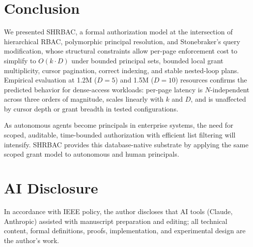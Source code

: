 \documentclass[conference]{IEEEtran}
\begin{document}
\section{Conclusion}
\label{sec:conclusion}

We presented SHRBAC, a formal authorization model at the intersection of hierarchical RBAC, polymorphic principal resolution, and Stonebraker's query modification, whose structural constraints allow per-page enforcement cost to simplify to $O(k \cdot D)$ under bounded principal sets, bounded local grant multiplicity, cursor pagination, correct indexing, and stable nested-loop plans. Empirical evaluation at 1.2M ($D{=}5$) and 1.5M ($D{=}10$) resources confirms the predicted behavior for dense-access workloads: per-page latency is $N$-independent across three orders of magnitude, scales linearly with $k$ and $D$, and is unaffected by cursor depth or grant breadth in tested configurations.

As autonomous agents become principals in enterprise systems, the need for scoped, auditable, time-bounded authorization with efficient list filtering will intensify. SHRBAC provides this database-native substrate by applying the same scoped grant model to autonomous and human principals.

\section*{AI Disclosure}
In accordance with IEEE policy, the author discloses that AI tools (Claude, Anthropic) assisted with manuscript preparation and editing; all technical content, formal definitions, proofs, implementation, and experimental design are the author's work.
\end{document}

